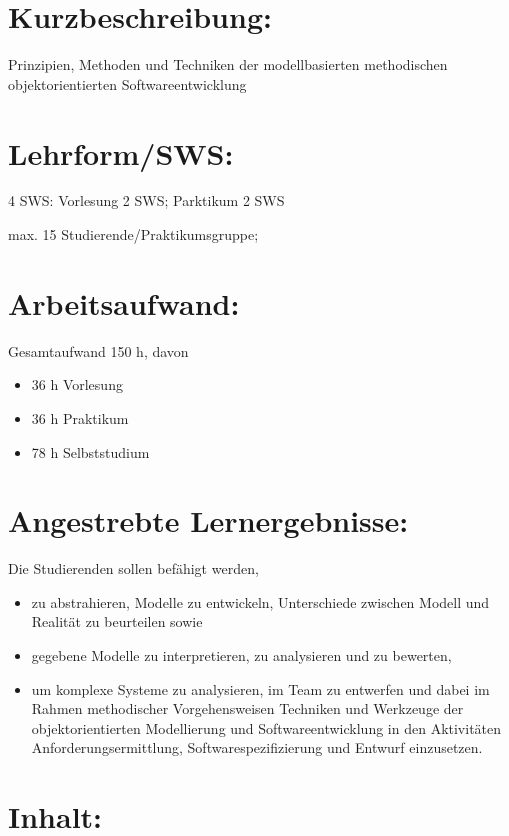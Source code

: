 \section*{Kurzbeschreibung:}\label{kurzbeschreibung-3}

Prinzipien, Methoden und Techniken der modellbasierten methodischen
objektorientierten Softwareentwicklung

\section*{Lehrform/SWS:}\label{lehrformsws-22}

4 SWS: Vorlesung 2 SWS; Parktikum 2 SWS

max. 15 Studierende/Praktikumsgruppe;

\section*{Arbeitsaufwand:}\label{arbeitsaufwand-21}

Gesamtaufwand 150 h, davon

\begin{itemize}
\item
  36 h Vorlesung
\item
  36 h Praktikum
\item
  78 h Selbststudium
\end{itemize}

\section*{Angestrebte
Lernergebnisse:}\label{angestrebte-lernergebnisse-22}

Die Studierenden sollen befähigt werden,

\begin{itemize}
\item
  zu abstrahieren, Modelle zu entwickeln, Unterschiede zwischen Modell
  und Realität zu beurteilen sowie
\item
  gegebene Modelle zu interpretieren, zu analysieren und zu bewerten,
\item
  um komplexe Systeme zu analysieren, im Team zu entwerfen und dabei im
  Rahmen methodischer Vorgehensweisen Techniken und Werkzeuge der
  objektorientierten Modellierung und Softwareentwicklung in den
  Aktivitäten Anforderungsermittlung, Softwarespezifizierung und Entwurf
  einzusetzen.
\end{itemize}

\section*{Inhalt:}\label{inhalt-22}

